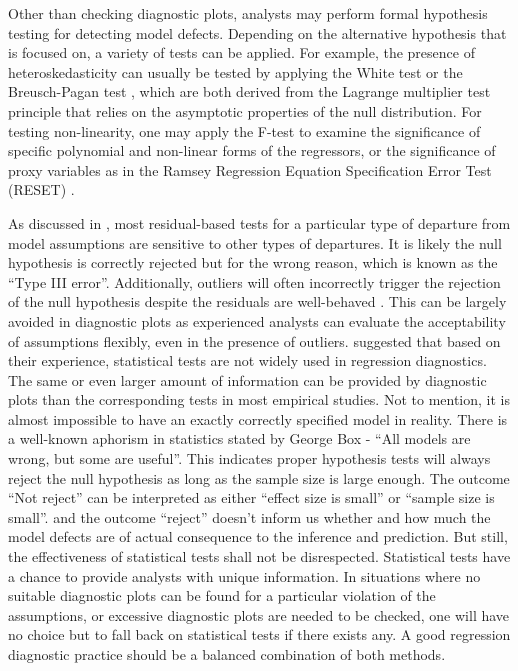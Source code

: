 \documentclass[]{interact}
\theoremstyle{plain}%
\theoremstyle{definition}
\theoremstyle{remark}
\begin{document}
Other than checking diagnostic plots, analysts may perform formal
hypothesis testing for detecting model defects. Depending on the
alternative hypothesis that is focused on, a variety of tests can be
applied. For example, the presence of heteroskedasticity can usually be
tested by applying the White test
\citep{white_heteroskedasticity-consistent_1980} or the Breusch-Pagan
test \citep{breusch_simple_1979}, which are both derived from the
Lagrange multiplier test \citep{silvey1959lagrangian} principle that
relies on the asymptotic properties of the null distribution. For
testing non-linearity, one may apply the F-test to examine the
significance of specific polynomial and non-linear forms of the
regressors, or the significance of proxy variables as in the Ramsey
Regression Equation Specification Error Test (RESET)
\citep{ramsey_tests_1969}.

As discussed in \citet{cook1982residuals}, most residual-based tests for
a particular type of departure from model assumptions are sensitive to
other types of departures. It is likely the null hypothesis is correctly
rejected but for the wrong reason, which is known as the ``Type III
error''. Additionally, outliers will often incorrectly trigger the
rejection of the null hypothesis despite the residuals are well-behaved
\citep{cook_applied_1999}. This can be largely avoided in diagnostic
plots as experienced analysts can evaluate the acceptability of
assumptions flexibly, even in the presence of outliers.
\citet{montgomery1982introduction} suggested that based on their
experience, statistical tests are not widely used in regression
diagnostics. The same or even larger amount of information can be
provided by diagnostic plots than the corresponding tests in most
empirical studies. Not to mention, it is almost impossible to have an
exactly correctly specified model in reality. There is a well-known
aphorism in statistics stated by George Box - ``All models are wrong,
but some are useful''. This indicates proper hypothesis tests will
always reject the null hypothesis as long as the sample size is large
enough. The outcome ``Not reject'' can be interpreted as either ``effect
size is small'' or ``sample size is small''. and the outcome ``reject''
doesn't inform us whether and how much the model defects are of actual
consequence to the inference and prediction. But still, the
effectiveness of statistical tests shall not be disrespected.
Statistical tests have a chance to provide analysts with unique
information. In situations where no suitable diagnostic plots can be
found for a particular violation of the assumptions, or excessive
diagnostic plots are needed to be checked, one will have no choice but
to fall back on statistical tests if there exists any. A good regression
diagnostic practice should be a balanced combination of both methods.
\end{document}
